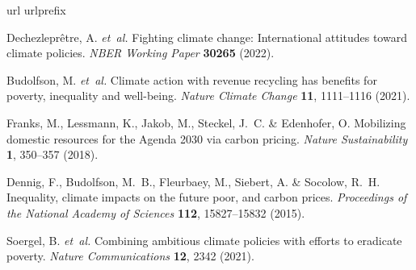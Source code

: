 \label{sec:bib}
% 
\begin{thebibliography}{10}
  \expandafter\ifx\csname url\endcsname\relax
    \def\url#1{\texttt{#1}}\fi
  \expandafter\ifx\csname urlprefix\endcsname\relax\def\urlprefix{URL }\fi
  \providecommand{\bibinfo}[2]{#2}
  \providecommand{\eprint}[2][]{\url{#2}}
  
  \bibinfo{author}{Dechezlepr{\^e}tre, A.} \emph{et~al.}
  \newblock \bibinfo{title}{Fighting climate change: {{International}} attitudes
    toward climate policies}.
  \newblock \emph{\bibinfo{journal}{NBER Working Paper}}
    \textbf{\bibinfo{volume}{30265}} (\bibinfo{year}{2022}).
  
  \bibinfo{author}{Budolfson, M.} \emph{et~al.}
  \newblock \bibinfo{title}{Climate action with revenue recycling has benefits
    for poverty, inequality and well-being}.
  \newblock \emph{\bibinfo{journal}{Nature Climate Change}}
    \textbf{\bibinfo{volume}{11}}, \bibinfo{pages}{1111--1116}
    (\bibinfo{year}{2021}).
  
  \bibinfo{author}{Franks, M.}, \bibinfo{author}{Lessmann, K.},
    \bibinfo{author}{Jakob, M.}, \bibinfo{author}{Steckel, J.~C.} \&
    \bibinfo{author}{Edenhofer, O.}
  \newblock \bibinfo{title}{Mobilizing domestic resources for the {{Agenda}} 2030
    via carbon pricing}.
  \newblock \emph{\bibinfo{journal}{Nature Sustainability}}
    \textbf{\bibinfo{volume}{1}}, \bibinfo{pages}{350--357}
    (\bibinfo{year}{2018}).
  
  \bibinfo{author}{Dennig, F.}, \bibinfo{author}{Budolfson, M.~B.},
    \bibinfo{author}{Fleurbaey, M.}, \bibinfo{author}{Siebert, A.} \&
    \bibinfo{author}{Socolow, R.~H.}
  \newblock \bibinfo{title}{Inequality, climate impacts on the future poor, and
    carbon prices}.
  \newblock \emph{\bibinfo{journal}{Proceedings of the National Academy of
    Sciences}} \textbf{\bibinfo{volume}{112}}, \bibinfo{pages}{15827--15832}
    (\bibinfo{year}{2015}).
  
  \bibinfo{author}{Soergel, B.} \emph{et~al.}
  \newblock \bibinfo{title}{Combining ambitious climate policies with efforts to
    eradicate poverty}.
  \newblock \emph{\bibinfo{journal}{Nature Communications}}
    \textbf{\bibinfo{volume}{12}}, \bibinfo{pages}{2342} (\bibinfo{year}{2021}).
  

\end{thebibliography}
